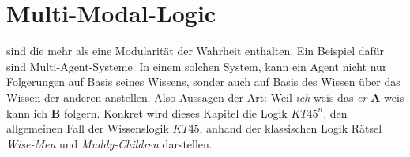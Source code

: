 

\chapter{Multi-Modal-Logic} %
\label{sec:multi_modal_logic}
\MML sind \NML die mehr als eine Modularität der Wahrheit enthalten.
Ein Beispiel dafür sind Multi-Agent-Systeme. 
In einem solchen System, kann ein Agent nicht nur Folgerungen auf Basis seines Wissens, sonder auch auf Basis des Wissen über das Wissen der anderen anstellen. Also Aussagen der Art: Weil \emph{ich} weis das \emph{er} \textbf{A} weis kann ich \textbf{B} folgern.
Konkret wird dieses Kapitel die Logik $KT45^n$, den allgemeinen Fall der Wissenslogik $KT45$, anhand der klassischen Logik Rätsel \emph{Wise-Men} und \emph{Muddy-Children} darstellen.





